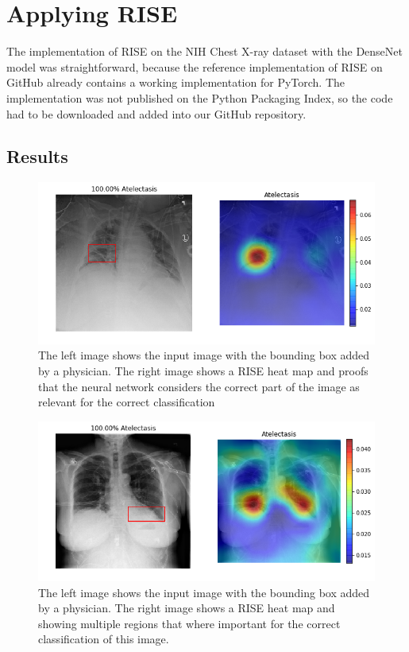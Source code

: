 \section{Applying RISE}

The implementation of RISE on the NIH Chest X-ray dataset with the DenseNet model was straightforward, because the reference implementation of RISE on GitHub \cite{risegithub} already contains a working implementation for PyTorch. The implementation was not published on the Python Packaging Index, so the code had to be downloaded and added into our GitHub repository.

\subsection{Results}
\begin{figure}[H]
\centering
\includegraphics[width=12cm]{chapters/03_classification/images/rise_0.png}
\caption{The left image shows the input image with the bounding box added by a physician. The right image shows a RISE heat map and proofs that the neural network considers the correct part of the image as relevant for the correct classification}
\label{rise_example_1}
\end{figure}

\begin{figure}[H]
\centering
\includegraphics[width=12cm]{chapters/03_classification/images/rise_2.png}
\caption{The left image shows the input image with the bounding box added by a physician. The right image shows a RISE heat map and showing multiple regions that where important for the correct classification of this image.}
\label{rise_example_2}
\end{figure}

